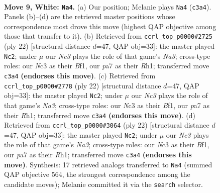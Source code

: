 \documentclass[11pt]{article}
\begin{document}
\clearpage

\begin{figure}[p]\centering
\begin{subfigure}{0.46\textwidth}\centering
\resizebox{\linewidth}{!}{%
\newchessgame
\chessboard[
  setfen={rnbqk2r/pp2bp2/2p2p2/3p3p/3P4/2N1P3/PP3PPP/R2QKBNR w KQkq - 0 9},
  showmover=false,
  pgfstyle=straightmove, color=movearrow, markmove={c3-a4}
]}
\caption{}
\end{subfigure}\hfill
\begin{subfigure}{0.46\textwidth}\centering
\resizebox{\linewidth}{!}{%
\newchessgame
\chessboard[
  setfen={r1bqk2r/5ppp/p1np4/1p1Np1b1/4P3/N1P5/PP3PPP/R2QKB1R w KQkq - 1 12},
  showmover=false,
  pgfstyle=straightmove, color=movearrow, markmove={a3-c2}
]}
\caption{}
\end{subfigure}
\\[4pt]
\begin{subfigure}{0.46\textwidth}\centering
\resizebox{\linewidth}{!}{%
\newchessgame
\chessboard[
  setfen={r1bqk2r/5ppp/p1np4/1p1Np1b1/4P3/N1P5/PP3PPP/R2QKB1R w KQkq - 1 12},
  showmover=false,
  pgfstyle=straightmove, color=movearrow, markmove={a3-c2}
]}
\caption{}
\end{subfigure}\hfill
\begin{subfigure}{0.46\textwidth}\centering
\resizebox{\linewidth}{!}{%
\newchessgame
\chessboard[
  setfen={r1bqk2r/5ppp/p1np4/1p1Np1b1/4P3/N1P5/PP3PPP/R2QKB1R w KQkq - 1 12},
  showmover=false,
  pgfstyle=straightmove, color=movearrow, markmove={a3-c2}
]}
\caption{}
\end{subfigure}
\caption{\textbf{Move 9, White: \texttt{Na4}.} (a) Our position; Melanie plays \texttt{Na4} (\texttt{c3a4}). Panels (b)--(d) are the retrieved master positions whose correspondence most drove this move (highest QAP objective among those that transfer to it). (b) Retrieved from \texttt{ccrl\_top\_p0000\#2725} (ply 22) [structural distance $d$=47, QAP obj=33]: the master played \texttt{Nc2}; under $\mu$ our \emph{Nc3} plays the role of that game's \emph{Na3}; cross-type roles: our \emph{N}c3 as their \emph{B}f1, our \emph{p}a7 as their \emph{R}h1; transferred move \texttt{c3a4} \textbf{(endorses this move)}. (c) Retrieved from \texttt{ccrl\_top\_p0000\#2778} (ply 22) [structural distance $d$=47, QAP obj=33]: the master played \texttt{Nc2}; under $\mu$ our \emph{Nc3} plays the role of that game's \emph{Na3}; cross-type roles: our \emph{N}c3 as their \emph{B}f1, our \emph{p}a7 as their \emph{R}h1; transferred move \texttt{c3a4} \textbf{(endorses this move)}. (d) Retrieved from \texttt{ccrl\_top\_p0000\#3064} (ply 22) [structural distance $d$=47, QAP obj=33]: the master played \texttt{Nc2}; under $\mu$ our \emph{Nc3} plays the role of that game's \emph{Na3}; cross-type roles: our \emph{N}c3 as their \emph{B}f1, our \emph{p}a7 as their \emph{R}h1; transferred move \texttt{c3a4} \textbf{(endorses this move)}. Synthesis: 17 retrieved analogs transferred to \texttt{Na4} (summed QAP objective 564, the strongest correspondence among the candidate moves); Melanie committed it via the \texttt{search} selector.}
\label{fig:thought-m16}
\end{figure}
\end{document}
